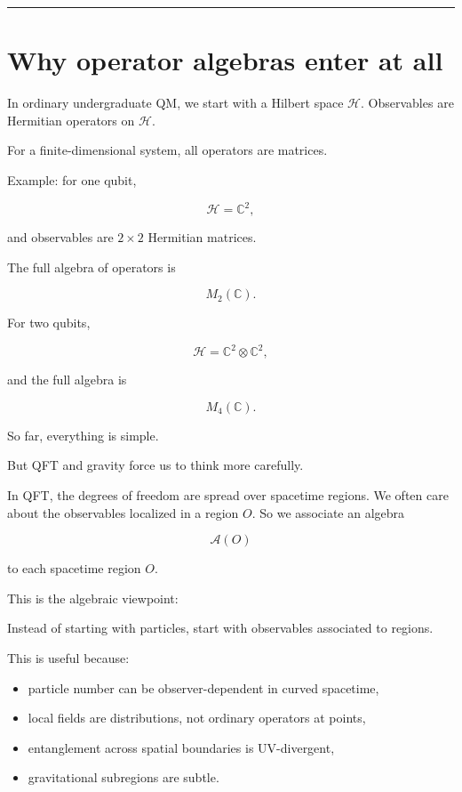 \documentclass[11pt,a4paper]{article}
\newenvironment{qiqtquote}{\begin{mdframed}[style=quotestyle]}{\end{mdframed}}
\begin{document}
\medskip\hrule\medskip

\section{Why operator algebras enter at all}

In ordinary undergraduate QM, we start with a Hilbert space $\mathcal{H}$. Observables are Hermitian operators on $\mathcal{H}$.

For a finite-dimensional system, all operators are matrices.

Example: for one qubit,

\[
\mathcal{H}=\mathbb{C}^2,
\]

and observables are $2\times 2$ Hermitian matrices.

The full algebra of operators is

\[
M_2(\mathbb{C}).
\]

For two qubits,

\[
\mathcal{H}=\mathbb{C}^2\otimes \mathbb{C}^2,
\]

and the full algebra is

\[
M_4(\mathbb{C}).
\]

So far, everything is simple.

But QFT and gravity force us to think more carefully.

In QFT, the degrees of freedom are spread over spacetime regions. We often care about the observables localized in a region $O$. So we associate an algebra

\[
\mathcal{A}(O)
\]

to each spacetime region $O$.

This is the algebraic viewpoint:

\begin{qiqtquote}
Instead of starting with particles, start with observables associated to regions.
\end{qiqtquote}

This is useful because:

\begin{itemize}
  \item particle number can be observer-dependent in curved spacetime,
  \item local fields are distributions, not ordinary operators at points,
  \item entanglement across spatial boundaries is UV-divergent,
  \item gravitational subregions are subtle.
\end{itemize}
\end{document}
